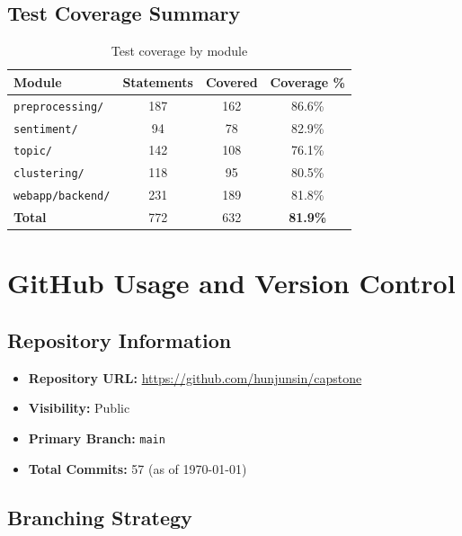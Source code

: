 \documentclass[12pt, letterpaper]{article}
\begin{document}
\subsection{Test Coverage Summary}
\begin{table}[H]
  \centering
  \caption{Test coverage by module}
  \label{tab:coverage}
  \begin{tabular}{lccc}
    \toprule
    \textbf{Module}      & \textbf{Statements} & \textbf{Covered} & \textbf{Coverage \%} \\
    \midrule
    \texttt{preprocessing/}      & 187 & 162 & 86.6\% \\
    \texttt{sentiment/}          & 94  & 78  & 82.9\% \\
    \texttt{topic/}              & 142 & 108 & 76.1\% \\
    \texttt{clustering/}         & 118 & 95  & 80.5\% \\
    \texttt{webapp/backend/}     & 231 & 189 & 81.8\% \\
    \midrule
    \textbf{Total}               & 772 & 632 & \textbf{81.9\%} \\
    \bottomrule
  \end{tabular}
\end{table}

\section{GitHub Usage and Version Control}
\label{sec:github}

\subsection{Repository Information}
\begin{itemize}
  \item \textbf{Repository URL:} \url{https://github.com/hunjunsin/capstone}
  \item \textbf{Visibility:} Public
  \item \textbf{Primary Branch:} \texttt{main}
  \item \textbf{Total Commits:} 57 (as of \today)
\end{itemize}

\subsection{Branching Strategy}
\end{document}
